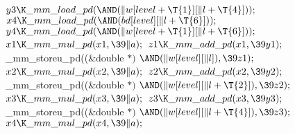${}\\{y3}\K\\{\_mm\_load\_pd}({\AND}(\|w[\\{level}+\T{1}][\|l+\T{4}]));{}$\6
${}\\{x4}\K\\{\_mm\_load\_pd}({\AND}(\\{bd}[\\{level}][\|l+\T{6}]));{}$\6
${}\\{y4}\K\\{\_mm\_load\_pd}({\AND}(\|w[\\{level}+\T{1}][\|l+\T{6}]));{}$\6
${}\\{x1}\K\\{\_mm\_mul\_pd}(\\{x1},\39\|a);{}$\6
${}\\{z1}\K\\{\_mm\_add\_pd}(\\{x1},\39\\{y1});{}$\6
\\{\_mm\_storeu\_pd}((\&{double} ${}{*}){}$ ${}{\AND}(\|w[\\{level}][\|l]),\39%
\\{z1});{}$\6
${}\\{x2}\K\\{\_mm\_mul\_pd}(\\{x2},\39\|a);{}$\6
${}\\{z2}\K\\{\_mm\_add\_pd}(\\{x2},\39\\{y2});{}$\6
\\{\_mm\_storeu\_pd}((\&{double} ${}{*}){}$ ${}{\AND}(\|w[\\{level}][\|l+%
\T{2}]),\39\\{z2});{}$\6
${}\\{x3}\K\\{\_mm\_mul\_pd}(\\{x3},\39\|a);{}$\6
${}\\{z3}\K\\{\_mm\_add\_pd}(\\{x3},\39\\{y3});{}$\6
\\{\_mm\_storeu\_pd}((\&{double} ${}{*}){}$ ${}{\AND}(\|w[\\{level}][\|l+%
\T{4}]),\39\\{z3});{}$\6
${}\\{x4}\K\\{\_mm\_mul\_pd}(\\{x4},\39\|a);{}$\6
